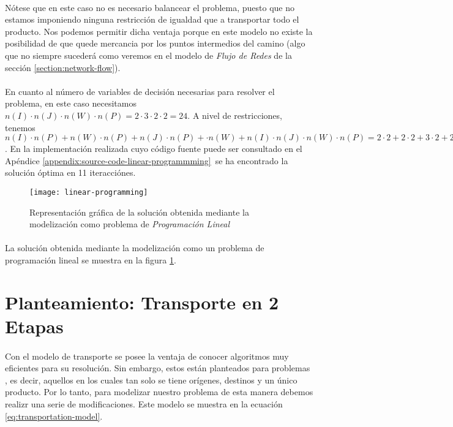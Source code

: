 \documentclass[a4paper, spanish]{article}
\begin{document}
    \paragraph{}
    Nótese que en este caso no es necesario balancear el problema, puesto que no estamos imponiendo ninguna restricción de igualdad que  a transportar todo el producto. Nos podemos permitir dicha ventaja porque en este modelo no existe la posibilidad de que quede mercancia por los puntos intermedios del camino (algo que no siempre sucederá como veremos en el modelo de \emph{Flujo de Redes} de la sección \ref{section:network-flow}).

    \paragraph{}
    En cuanto al número de variables de decisión necesarias para resolver el problema, en este caso necesitamos $n(I) \cdot n(J) \cdot n(W) \cdot n(P) = 2 \cdot 3 \cdot 2 \cdot 2 = 24$. A nivel de restricciones, tenemos $n(I) \cdot n(P) + n(W) \cdot n(P) + n(J) \cdot n(P) + \cdot n(W) + n(I) \cdot n(J) \cdot n(W) \cdot n(P) = 2 \cdot 2 + 2 \cdot 2 + 3 \cdot 2 + 2 \cdot 3 \cdot 2 \cdot 2 = 38$. En la implementación realizada cuyo código fuente puede ser consultado en el Apéndice \ref{appendix:source-code-linear-programmming} se ha encontrado la solución óptima en 11 iteracciónes.

    \begin{figure}[!hp]
      \centering
      \texttt{[image: linear-programming]}
      \caption{Representación gráfica de la solución obtenida mediante la modelización como problema de \emph{Programación Lineal}}
      \label{img:graph-linear-programming}
    \end{figure}

    \paragraph{}
    La solución obtenida mediante la modelización como un problema de programación lineal se muestra en la figura \ref{img:graph-linear-programming}.


  \section{Planteamiento: Transporte en 2 Etapas}
  \label{section:transportation}

    \paragraph{}
    Con el modelo de transporte se posee la ventaja de conocer algoritmos muy eficientes para su resolución. Sin embargo, estos están planteados para problemas , es decir, aquellos en los cuales tan solo se tiene orígenes, destinos y un único producto. Por lo tanto, para modelizar nuestro problema de esta manera debemos realizr una serie de modificaciones. Este modelo se muestra en la ecuación \eqref{eq:transportation-model}.
\end{document}
